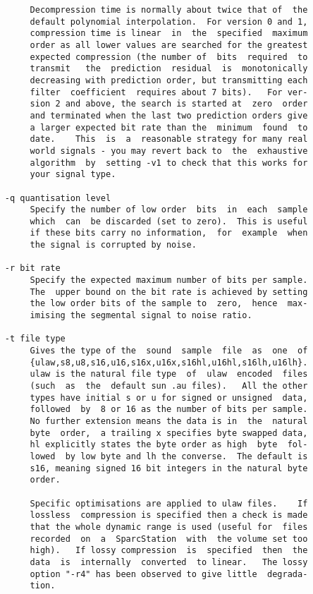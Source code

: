 \begin{verbatim}
          Decompression time is normally about twice that of  the
          default polynomial interpolation.  For version 0 and 1,
          compression time is linear  in  the  specified  maximum
          order as all lower values are searched for the greatest
          expected compression (the number of  bits  required  to
          transmit   the  prediction  residual  is  monotonically
          decreasing with prediction order, but transmitting each
          filter  coefficient  requires about 7 bits).   For ver-
          sion 2 and above, the search is started at  zero  order
          and terminated when the last two prediction orders give
          a larger expected bit rate than the  minimum  found  to
          date.    This  is  a  reasonable strategy for many real
          world signals - you may revert back to  the  exhaustive
          algorithm  by  setting -v1 to check that this works for
          your signal type.

     -q quantisation level
          Specify the number of low order  bits  in  each  sample
          which  can  be discarded (set to zero).  This is useful
          if these bits carry no information,  for  example  when
          the signal is corrupted by noise.

     -r bit rate
          Specify the expected maximum number of bits per sample.
          The  upper bound on the bit rate is achieved by setting
          the low order bits of the sample to  zero,  hence  max-
          imising the segmental signal to noise ratio.

     -t file type
          Gives the type of the  sound  sample  file  as  one  of
          {ulaw,s8,u8,s16,u16,s16x,u16x,s16hl,u16hl,s16lh,u16lh}.
          ulaw is the natural file type  of  ulaw  encoded  files
          (such  as  the  default sun .au files).   All the other
          types have initial s or u for signed or unsigned  data,
          followed  by  8 or 16 as the number of bits per sample.
          No further extension means the data is in  the  natural
          byte  order,  a trailing x specifies byte swapped data,
          hl explicitly states the byte order as high  byte  fol-
          lowed  by low byte and lh the converse.  The default is
          s16, meaning signed 16 bit integers in the natural byte
          order.

          Specific optimisations are applied to ulaw files.    If
          lossless  compression is specified then a check is made
          that the whole dynamic range is used (useful for  files
          recorded  on  a  SparcStation  with  the volume set too
          high).   If lossy compression  is  specified  then  the
          data  is  internally  converted  to linear.   The lossy
          option "-r4" has been observed to give little  degrada-
          tion.


\end{verbatim}
